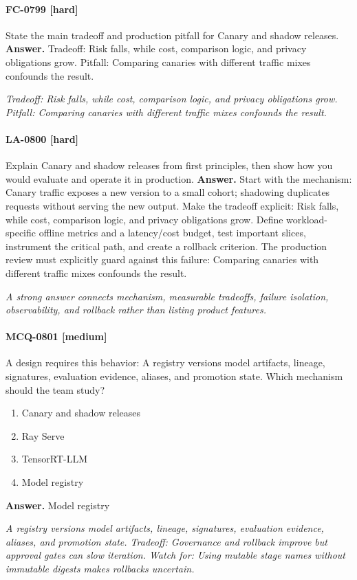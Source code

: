 \paragraph{FC-0799 [hard]} State the main tradeoff and production pitfall for Canary and shadow releases.
\noindent\textbf{Answer.} Tradeoff: Risk falls, while cost, comparison logic, and privacy obligations grow. Pitfall: Comparing canaries with different traffic mixes confounds the result.
\par\textit{Tradeoff: Risk falls, while cost, comparison logic, and privacy obligations grow. Pitfall: Comparing canaries with different traffic mixes confounds the result.}
\paragraph{LA-0800 [hard]} Explain Canary and shadow releases from first principles, then show how you would evaluate and operate it in production.
\noindent\textbf{Answer.} Start with the mechanism: Canary traffic exposes a new version to a small cohort; shadowing duplicates requests without serving the new output. Make the tradeoff explicit: Risk falls, while cost, comparison logic, and privacy obligations grow. Define workload-specific offline metrics and a latency/cost budget, test important slices, instrument the critical path, and create a rollback criterion. The production review must explicitly guard against this failure: Comparing canaries with different traffic mixes confounds the result.
\par\textit{A strong answer connects mechanism, measurable tradeoffs, failure isolation, observability, and rollback rather than listing product features.}
\paragraph{MCQ-0801 [medium]} A design requires this behavior: A registry versions model artifacts, lineage, signatures, evaluation evidence, aliases, and promotion state. Which mechanism should the team study?
\begin{enumerate}[label=\Alph*.]
\item Canary and shadow releases
\item Ray Serve
\item TensorRT-LLM
\item Model registry
\end{enumerate}
\noindent\textbf{Answer.} Model registry
\par\textit{A registry versions model artifacts, lineage, signatures, evaluation evidence, aliases, and promotion state. Tradeoff: Governance and rollback improve but approval gates can slow iteration. Watch for: Using mutable stage names without immutable digests makes rollbacks uncertain.}
